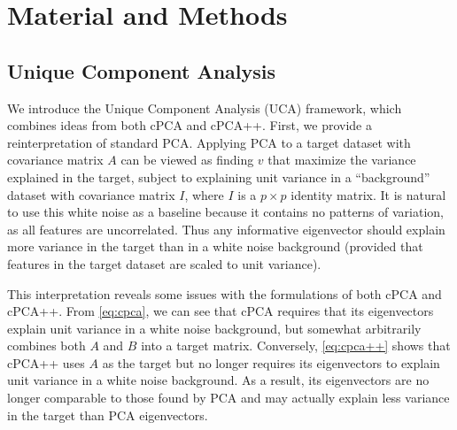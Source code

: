 \documentclass[10pt]{article}
\begin{document}
\section{Material and Methods\label{sec:method}}



\subsection{Unique Component Analysis}
We introduce the Unique Component Analysis (UCA) framework, which combines ideas from both cPCA and cPCA++. First, we provide a reinterpretation of standard PCA. Applying PCA to a target dataset with covariance matrix $A$ can be viewed as finding $v$ that maximize the variance explained in the target, subject to explaining unit variance in a ``background'' dataset with covariance matrix $I$, where $I$ is a $p \times p$ identity matrix. It is natural to use this white noise as a baseline because it contains no patterns of variation, as all features are uncorrelated. Thus any informative eigenvector should explain more variance in the target than in a white noise background (provided that features in the target dataset are scaled to unit variance).

This interpretation reveals some issues with the formulations of both cPCA and cPCA++. From \eqref{eq:cpca}, we can see that cPCA requires that its eigenvectors explain unit variance in a white noise background, but somewhat arbitrarily combines both $A$ and $B$ into a target matrix. Conversely, \eqref{eq:cpca++} shows that cPCA++ uses $A$ as the target but no longer requires its eigenvectors to explain unit variance in a white noise background. As a result, its eigenvectors are no longer comparable to those found by PCA and may actually explain less variance in the target than PCA eigenvectors.
\end{document}
